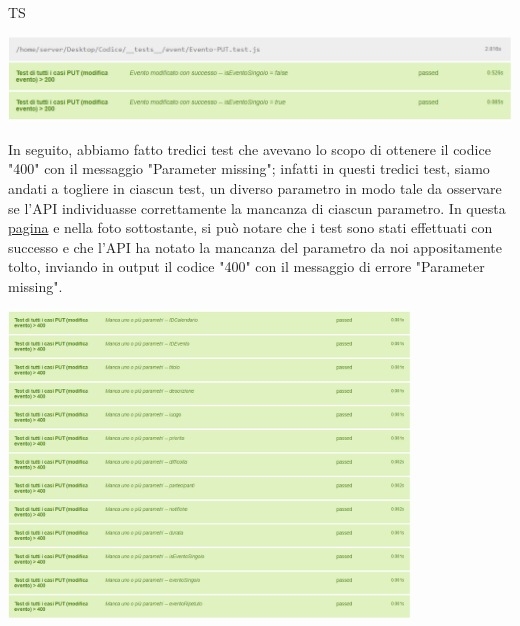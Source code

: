 \begin{listaPersonale}{TS}
                \begin{center}
                        \includegraphics[width=1\textwidth, height=0.11\textheight]{img/png/tests/EventoPut/200_PutEvento.png}
                \end{center}
                In seguito, abbiamo fatto tredici test che avevano lo scopo di ottenere il codice "400" con il messaggio "Parameter missing"; infatti in questi tredici test, siamo andati a togliere in ciascun test, un diverso parametro in modo tale da osservare se l'API individuasse correttamente la mancanza di ciascun parametro. In questa \href{https://plan-it.it/test-report.html} {pagina} e nella foto sottostante, si può notare che i test sono stati effettuati con successo e che l'API ha notato la mancanza del parametro da noi appositamente tolto, inviando in output il codice "400" con il messaggio di errore "Parameter missing".
                \begin{center}
                        \includegraphics[width=0.8\textwidth, height=0.4\textheight]{img/png/tests/EventoPut/400_missingParameter_PutEvento.png}

\end{center}
\end{listaPersonale}
